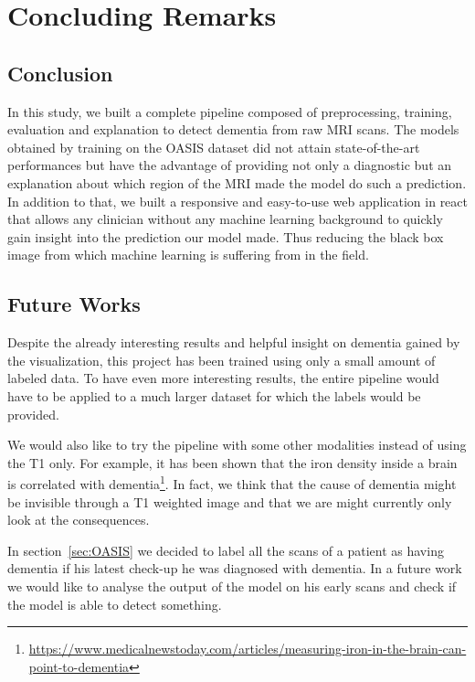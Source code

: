 \chapter{Concluding Remarks}
\label{chap:conculusion}

\section{Conclusion}
In this study, we built a complete pipeline composed of preprocessing, training, evaluation and explanation to detect dementia from raw MRI scans. The models obtained by training on the OASIS dataset did not attain state-of-the-art performances but have the advantage of providing not only a diagnostic but an explanation about which region of the MRI made the model do such a prediction. In addition to that, we built a responsive and easy-to-use web application in react\footnotemark{} that allows any clinician without any machine learning background to quickly gain insight into the prediction our model made. Thus reducing the black box image from which machine learning is suffering from in the field.  

\section{Future Works}
Despite the already interesting results and helpful insight on dementia gained by the visualization, this project has been trained using only a small amount of labeled data. To have even more interesting results, the entire pipeline would have to be applied to a much larger dataset for which the labels would be provided.

We would also like to try the pipeline with some other modalities instead of using the T1 only. For example, it has been shown that the iron density inside a brain is correlated with dementia\footnote{\href{https://www.medicalnewstoday.com/articles/measuring-iron-in-the-brain-can-point-to-dementia}{https://www.medicalnewstoday.com/articles/measuring-iron-in-the-brain-can-point-to-dementia}}. In fact, we think that the cause of dementia might be invisible through a T1 weighted image and that we are might currently only look at the consequences.

In section~\ref{sec:OASIS} we decided to label all the scans of a patient as having dementia if his latest check-up he was diagnosed with dementia. In a future work we would like to analyse the output of the model on his early scans and check if the model is able to detect something.

